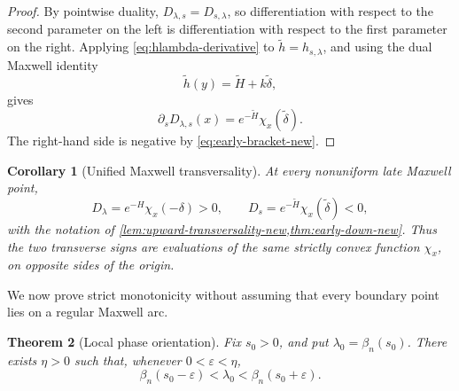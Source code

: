 \documentclass[11pt]{article}
\theoremstyle{plain}
\newtheorem{theorem}{Theorem}[section]
\newtheorem{corollary}[theorem]{Corollary}
\theoremstyle{definition}
\theoremstyle{remark}
\begin{document}
\begin{proof}
By pointwise duality, \(D_{\lambda,s}=D_{s,\lambda}\), so differentiation with respect to the second parameter on the left is differentiation with respect to the first parameter on the right.  Applying \eqref{eq:hlambda-derivative} to \(\widetilde h=h_{s,\lambda}\), and using the dual Maxwell identity
\[
\widetilde h(y)=\widetilde H+k\widetilde\delta,
\]
gives
\begin{equation}\label{eq:Ds-chi}
\partial_sD_{\lambda,s}(x)
=e^{-\widetilde H}\chi_x(\widetilde\delta).
\end{equation}
The right-hand side is negative by \eqref{eq:early-bracket-new}.
\end{proof}

\begin{corollary}[Unified Maxwell transversality]\label{cor:unified-transversality}
At every nonuniform late Maxwell point,
\[
D_\lambda=e^{-H}\chi_x(-\delta)>0,
\qquad
D_s=e^{-\widetilde H}\chi_x(\widetilde\delta)<0,
\]
with the notation of \cref{lem:upward-transversality-new,thm:early-down-new}.  Thus the two transverse signs are evaluations of the same strictly convex function \(\chi_x\), on opposite sides of the origin.
\end{corollary}

We now prove strict monotonicity without assuming that every boundary point lies on a regular Maxwell arc.

\begin{theorem}[Local phase orientation]\label{thm:local-orientation}
Fix \(s_0>0\), and put \(\lambda_0=\beta_n(s_0)\).  There exists \(\eta>0\) such that, whenever \(0<\varepsilon<\eta\),
\begin{equation}\label{eq:local-orientation}
\beta_n(s_0-\varepsilon)<\lambda_0
<\beta_n(s_0+\varepsilon).
\end{equation}
\end{theorem}
\end{document}
